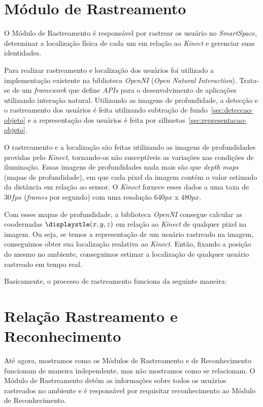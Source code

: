 \section{Módulo de Rastreamento}

	O Módulo de Rastreamento é responsável por rastrear os usuário no \textit{SmartSpace}, determinar a localização física de cada um em relação ao \textit{Kinect} e gerenciar suas identidades.

	Para realizar rastreamento e localização dos usuários foi utilizado a implementação existente na biblioteca \textit{OpenNI} (\textit{Open Natural Interaction}). Trata-se de um \textit{framework} que define \textit{APIs} para o desenvolvimento de aplicações utilizando interação natural. Utilizando as imagens de profundidade, a detecção e o rastreamento dos usuários é feita utilizando subtração de fundo~\ref{sec:deteccao-objeto} e a representação dos usuários é feita por silhuetas~\ref{sec:representacao-objeto}. 

	O rastreamento e a localização são feitas utilizando as imagens de profundidades providas pelo \textit{Kinect}, tornando-os não susceptíveis as variações nas condições de iluminação. Essas imagens de profundidades nada mais são que \textit{depth maps} (mapas de profundidade), em que cada pixel da imagem contém o valor estimado da distância em relação ao sensor. O \textit{Kinect} fornece esses dados a uma taxa de $\displaystyle 30 fps$ (\textit{frames} por segundo) com uma resolução $\displaystyle 640px$ x $\displaystyle 480px$.
	
	Com esses mapas de profundidade, a biblioteca \textit{OpenNI} consegue calcular as coodernadas $\displaystle (x,y,z)$ em relação ao \textit{Kinect} de qualquer pixel na imagem. Ou seja, se temos a representação de um usuário rastreado na imagem, conseguimos obter sua localização realativa ao \textit{Kinect}. Então, fixando a posição do mesmo no ambiente, conseguimos estimar a localização de qualquer usuário rastreado em tempo real.

	Basicamente, o processo de rastreamento funciona da seguinte maneira:


\section{Relação Rastreamento e Reconhecimento}
\label{sec:rastreamento-reconheicmento}

	Até agora, mostramos como os Módulos de Rastreamento e de Reconhecimento funcionam de maneira independente, mas não mostramos como se relacionam. O Módulo de Rastreamento detém as informações sobre todos os usuários rastreados no ambiente e é responsável por requisitar reconhecimento ao Módulo de Reconhecimento.

